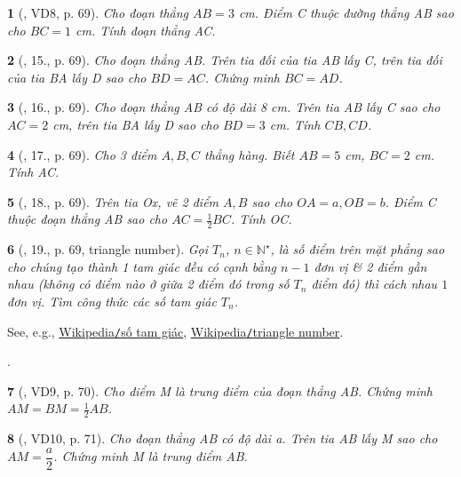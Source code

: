 \documentclass{article}
\newtheorem{baitoan}{}
\begin{document}
\begin{baitoan}[\cite{Binh_Toan_6_tap_2}, VD8, p. 69]
	Cho đoạn thẳng $AB = 3$ {\rm cm}. Điểm C thuộc đường thẳng AB sao cho $BC = 1$ {\rm cm}. Tính  đoạn thẳng AC.
\end{baitoan}

\begin{baitoan}[\cite{Binh_Toan_6_tap_2}, 15., p. 69]
	Cho đoạn thẳng AB. Trên tia đối của tia AB lấy C, trên tia đối của tia BA lấy D sao cho $BD = AC$. Chứng minh $BC = AD$.
\end{baitoan}

\begin{baitoan}[\cite{Binh_Toan_6_tap_2}, 16., p. 69]
	Cho đoạn thẳng AB có độ dài {\rm8 cm}. Trên tia AB lấy C sao cho $AC = 2$ {\rm cm}, trên tia BA lấy D sao cho $BD = 3$ {\rm cm}. Tính  $CB,CD$.
\end{baitoan}

\begin{baitoan}[\cite{Binh_Toan_6_tap_2}, 17., p. 69]
	Cho 3 điểm $A,B,C$ thẳng hàng. Biết $AB = 5$ {\rm cm}, $BC = 2$ {\rm cm}. Tính  AC.
\end{baitoan}

\begin{baitoan}[\cite{Binh_Toan_6_tap_2}, 18., p. 69]
	Trên tia Ox, vẽ 2 điểm $A,B$ sao cho $OA = a,OB = b$. Điểm C thuộc đoạn thẳng AB sao cho $AC = \frac{1}{2}BC$. Tính  OC.
\end{baitoan}

\begin{baitoan}[\cite{Binh_Toan_6_tap_2}, 19., p. 69, triangle number]
	Gọi $T_n$, $n\in\mathbb{N}^\star$, là số điểm trên mặt phẳng sao cho chúng tạo thành 1 tam giác đều có cạnh bằng $n - 1$ đơn vị \& 2 điểm gần nhau (không có điểm nào ở giữa 2 điểm đó trong số $T_n$ điểm đó) thì cách nhau $1$ đơn vị. Tìm công thức các số tam giác $T_n$.
\end{baitoan}
See, e.g., \href{https://vi.wikipedia.org/wiki/S%E1%BB%91_tam_gi%C3%A1c}{Wikipedia{\tt/}số tam giác}, \href{https://en.wikipedia.org/wiki/Triangular_number}{Wikipedia{\tt/}triangle number}.

\cite[20., p. 70]{Binh_Toan_6_tap_2}.

\begin{baitoan}[\cite{Binh_Toan_6_tap_2}, VD9, p. 70]
	Cho điểm M là trung điểm của đoạn thẳng AB. Chứng minh $AM = BM = \frac{1}{2}AB$.
\end{baitoan}

\begin{baitoan}[\cite{Binh_Toan_6_tap_2}, VD10, p. 71]
	Cho đoạn thẳng AB có độ dài a. Trên tia AB lấy M sao cho $AM = \dfrac{a}{2}$. Chứng minh M là trung điểm AB.
\end{baitoan}
\end{document}
